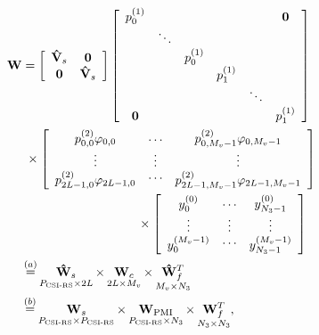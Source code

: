 \documentclass[lettersize,journal]{IEEEtran}
\begin{document}
\begin{align}
{\bf{W}} &= \left[ {\begin{array}{*{20}{c}}
{{{{\bf{\hat V}}}_s}}&{\bf{0}}\\
{\bf{0}}&{{{{\bf{\hat V}}}_s}}
\end{array}} \right]\left[ {\begin{array}{*{20}{c}}
{p_0^{(1)}}&{}&{}&{}&{}&{\bf{0}}\\
{}& \ddots &{}&{}&{}&{}\\
{}&{}&{p_0^{(1)}}&{}&{}&{}\\
{}&{}&{}&{p_1^{(1)}}&{}&{}\\
{}&{}&{}&{}& \ddots &{}\\
{\bf{0}}&{}&{}&{}&{}&{p_1^{(1)}}
\end{array}} \right] \notag\\
& \; \times \left[ {\begin{array}{*{20}{c}}
{p_{0,0}^{(2)}{\varphi _{0,0}}}\\
 \vdots \\
{p_{2L - 1,0}^{(2)}{\varphi _{2L - 1,0}}}
\end{array}\begin{array}{*{20}{c}}
 \cdots \\
 \vdots \\
 \cdots 
\end{array}\begin{array}{*{20}{c}}
{p_{0,{M_v} - 1}^{(2)}{\varphi _{0,{M_v} - 1}}}\\
 \vdots \\
{p_{2L - 1,{M_v} - 1}^{(2)}{\varphi _{2L - 1,{M_v} - 1}}}
\end{array}} \right]\notag\\
&\qquad \qquad  \qquad \qquad \quad \; \times \left[ {\begin{array}{*{20}{c}}
{y_0^{(0)}}\\
 \vdots \\
{y_0^{({M_v} - 1)}}
\end{array}\begin{array}{*{20}{c}}
 \cdots \\
 \vdots \\
 \cdots 
\end{array}\begin{array}{*{20}{c}}
{y_{{N_3} - 1}^{(0)}}\\
 \vdots \\
{y_{{N_3} - 1}^{({M_v} - 1)}}
\end{array}} \right] \notag\\
&\mathop  = \limits^{(a)} \mathop {{{{\bf{\hat W}}}_s}}\limits_{{P_{{\text{CSI-RS}}}} \times 2L} \times \mathop {{{\bf{W}}_c}}\limits_{2L \times {M_v}} \times \mathop {{\bf{\hat W}}_f^T}\limits_{{M_v} \times {N_3}} \notag\\
&\mathop  = \limits^{(b)} \mathop {{{\bf{W}}_s}}\limits_{{P_{{\text{CSI-RS}}}} \times {P_{{\text{CSI-RS}}}}} \times \mathop {{{\bf{W}}_{{\rm{PMI}}}}}\limits_{{P_{{\text{CSI-RS}}}} \times {N_3}} \times \mathop {{\bf{W}}_f^T}\limits_{{N_3} \times {N_3}} ,
\end{align}
\end{document}
